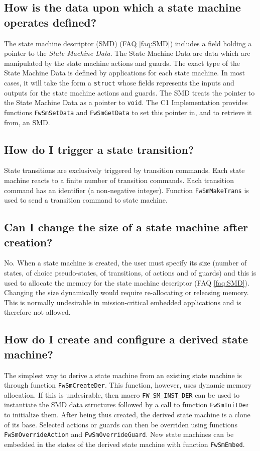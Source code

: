\documentclass[faq]{../fwprofile}
\begin{document}
\subsection{How is the data upon which a state machine operates defined?}\label{faq:state_machine_data}
The state machine descriptor (SMD) (FAQ \ref{faq:SMD}) includes a field holding a pointer to the \emph{State Machine Data}. The State Machine Data are data which 
are manipulated by the state machine actions and guards. The exact type of the State Machine Data is defined by applications for each state machine. 
In most cases, it will take the form a \texttt{struct} whose fields represents the inputs and outputs for the state machine actions and guards. 
The SMD treats the pointer to the State Machine Data as a pointer to \texttt{void}. The C1 Implementation provides functions \texttt{FwSmSetData} 
and \texttt{FwSmGetData} to set this pointer in, and to retrieve it from, an SMD.

\subsection{How do I trigger a state transition?}\label{faq:SM_StateTransition}
State transitions are exclusively triggered by transition commands. Each state machine reacts to a finite number of transition commands. Each transition 
command has an identifier (a non-negative integer). Function \texttt{FwSmMakeTrans} is used to send a transition command to state machine.

\subsection{Can I change the size of a state machine after creation?}
No. When a state machine is created, the user must specify its size (number of states, of choice pseudo-states, of transitions, of actions and of guards) 
and this is used to allocate the memory for the state machine descriptor (FAQ \ref{faq:SMD}). Changing the size dynamically would require re-allocating or 
releasing memory. This is normally undesirable in mission-critical embedded applications and is therefore not allowed. 

\subsection{How do I create and configure a derived state machine?}
The simplest way to derive a state machine from an existing state machine is through function \texttt{FwSmCreateDer}. This function, however, 
uses dynamic memory allocation. If this is undesirable, then macro \texttt{FW\_SM\_INST\_DER} can be used to instantiate the SMD data structures followed 
by a call to function \texttt{FwSmInitDer} to initialize them. After being thus created, the derived state machine is a clone of its base. 
Selected actions or guards can then be overriden using functions \texttt{FwSmOverrideAction} and \texttt{FwSmOverrideGuard}. New state machines can be embedded 
in the states of the derived state machine with function \texttt{FwSmEmbed}.
\end{document}
